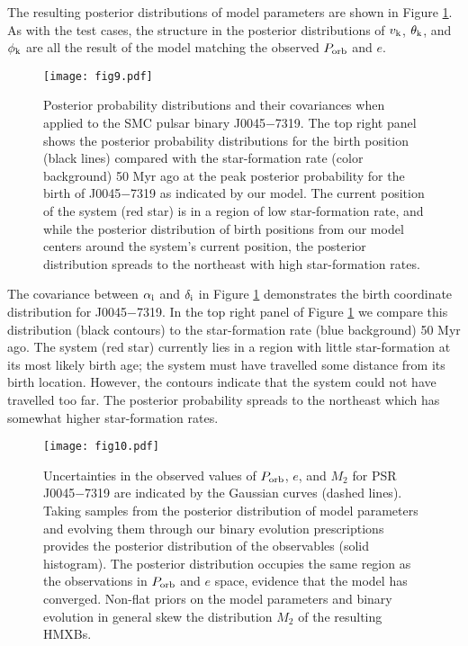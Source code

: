 \documentclass[usenatbib]{mnras}
\begin{document}
The resulting posterior distributions of model parameters are shown in Figure \ref{fig:J0045_corner}. As with the test cases, the structure in the posterior distributions of $v_{\rm k}$, $\theta_{\rm k}$, and $\phi_{\rm k}$ are all the result of the model matching the observed $P_{\rm orb}$ and $e$. 




\begin{figure*}
\begin{center}
\texttt{[image: fig9.pdf]}
\caption{Posterior probability distributions and their covariances when applied to the SMC pulsar binary J0045$-$7319. The top right panel shows the posterior probability distributions for the birth position (black lines) compared with the star-formation rate (color background) 50 Myr ago at the peak posterior probability for the birth of J0045$-$7319 as indicated by our model. The current position of the system (red star) is in a region of low star-formation rate, and while the posterior distribution of birth positions from our model centers around the system's current position, the posterior distribution spreads to the northeast with high star-formation rates.}
\label{fig:J0045_corner}
\end{center}
\end{figure*}

The covariance between $\alpha_{\rm i}$ and $\delta_{\rm i}$ in Figure \ref{fig:J0045_corner} demonstrates the birth coordinate distribution for J0045$-$7319. In the top right panel of Figure \ref{fig:J0045_corner} we compare this distribution (black contours) to the star-formation rate (blue background) 50 Myr ago. The system (red star) currently lies in a region with little star-formation at its most likely birth age; the system must have travelled some distance from its birth location. However, the contours indicate that the system could not have travelled too far. The posterior probability spreads to the northeast which has somewhat higher star-formation rates.



\begin{figure*}
\begin{center}
\texttt{[image: fig10.pdf]}
\caption{Uncertainties in the observed values of $P_{\rm orb}$, $e$, and $M_2$ for PSR J0045$-$7319 are indicated by the Gaussian curves (dashed lines). Taking samples from the posterior distribution of model parameters and evolving them through our binary evolution prescriptions provides the posterior distribution of the observables (solid histogram). The posterior distribution occupies the same region as the observations in $P_{\rm orb}$ and $e$ space, evidence that the model has converged. Non-flat priors on the model parameters and binary evolution in general skew the distribution $M_2$ of the resulting HMXBs.}
\label{fig:J0045_forward}
\end{center}
\end{figure*}
\end{document}
